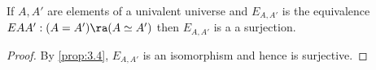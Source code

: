 \begin{cor}\label{cor:3.5}
If $A,A'$ are elements of a univalent universe and $E_{A,A'}$ is the equivalence
$EAA':(A=A')\ra (A\simeq A')$ then $E_{A,A'}$ is a a surjection.
\end{cor}
\begin{proof}
  By \autoref{prop:3.4}, $E_{A,A'}$ is an isomorphism and hence is surjective.
\end{proof}




